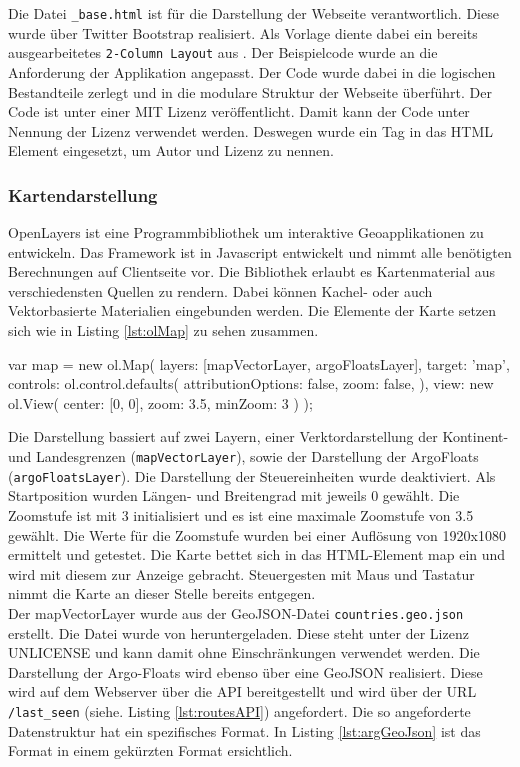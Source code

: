 Die Datei \texttt{\_base.html} ist für die Darstellung der Webseite verantwortlich. Diese wurde über Twitter Bootstrap realisiert. Als Vorlage diente dabei ein bereits ausgearbeitetes  \texttt{2-Column Layout} aus \cite{Ng2014}. Der Beispielcode wurde an die Anforderung der Applikation angepasst. Der Code wurde dabei in die logischen Bestandteile zerlegt und in die modulare Struktur der Webseite überführt. Der Code ist unter einer MIT Lizenz veröffentlicht. Damit kann der Code unter Nennung der Lizenz verwendet werden. Deswegen wurde ein Tag in das HTML Element eingesetzt, um Autor und Lizenz zu nennen.

\subsubsection{Kartendarstellung}

 OpenLayers ist eine Programmbibliothek um interaktive Geoapplikationen zu entwickeln. Das Framework ist in Javascript entwickelt und nimmt alle benötigten Berechnungen auf Clientseite vor. Die Bibliothek erlaubt es Kartenmaterial aus verschiedensten Quellen zu rendern. Dabei können Kachel- oder auch Vektorbasierte Materialien eingebunden werden.
Die Elemente der Karte setzen sich wie in Listing \ref{lst:olMap} zu sehen zusammen.

\begin{javascript}[label={lst:olMap}, caption={Das ol.Map Element aus der Kartendarstellung}]
 var map = new ol.Map({
    layers: [mapVectorLayer, argoFloatsLayer],
    target: 'map',
    controls: ol.control.defaults({
        attributionOptions: false,
        zoom: false,
    }),
    view: new ol.View({
        center: [0, 0],
        zoom: 3.5,
        minZoom: 3
    })
});
\end{javascript}

Die Darstellung bassiert auf zwei Layern, einer Verktordarstellung der Kontinent- und Landesgrenzen (\texttt{mapVectorLayer}), sowie der Darstellung der ArgoFloats (\texttt{argoFloatsLayer}). Die Darstellung der Steuereinheiten wurde deaktiviert. Als Startposition wurden Längen- und Breitengrad mit jeweils 0 gewählt. Die Zoomstufe ist mit 3 initialisiert und es ist eine maximale Zoomstufe von 3.5 gewählt. Die Werte für die Zoomstufe wurden bei einer Auflösung von 1920x1080 ermittelt und getestet.
Die Karte bettet sich in das HTML-Element map ein und wird mit diesem zur Anzeige gebracht. Steuergesten mit Maus und Tastatur nimmt die Karte an dieser Stelle bereits entgegen.
\\
Der mapVectorLayer wurde aus der GeoJSON-Datei \texttt{countries.geo.json}  erstellt. Die Datei wurde von \cite{sundstrm16} heruntergeladen. Diese steht unter der Lizenz UNLICENSE und kann damit ohne Einschränkungen verwendet werden. Die Darstellung der Argo-Floats wird ebenso über eine GeoJSON realisiert. Diese wird auf dem Webserver über die API bereitgestellt und wird über der URL \texttt{/last\_seen} (siehe. Listing \ref{lst:routesAPI}) angefordert. Die so angeforderte Datenstruktur hat ein spezifisches Format. In Listing \ref{lst:argGeoJson} ist das Format in einem gekürzten Format ersichtlich. 

